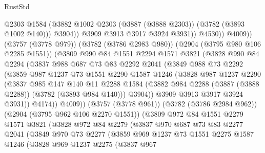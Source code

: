 \begin{lexlean}{RustStd}
\begin{coremodule}
                          @2303
                          @1584
                          (@3882 @1002 @2303 (@3887 (@3888 @2303)) (@3782 (@3893 @1002 @140)))
                          @3904))
                      @3909
                      @3913
                      @3917
                      @3924
                      @3931))
                  @4530))
              @4009))
          (@3757 (@3778 @979))
          (@3782 (@3786 @2983 @980))
          (@2904 (@3795 @980 @106 @2285 @1551))
          (@3809
            @990
            @84
            @1551
            @2294
            @1571
            @3821
            (@3828
              @990
              @84
              @2294
              (@3837
                @988
                @687
                @73
                @83
                @2292
                @2041
                (@3849
                  @988
                  @73
                  @2292
                  (@3859
                    @987
                    @1237
                    @73
                    @1551
                    @2290
                    @1587
                    @1246
                    (@3828
                      @987
                      @1237
                      @2290
                      (@3837
                        @985
                        @147
                        @140
                        @11
                        @2288
                        @1584
                        (@3882 @984 @2288 (@3887 (@3888 @2288)) (@3782 (@3893 @984 @140)))
                        @3904))
                    @3909
                    @3913
                    @3917
                    @3924
                    @3931))
                @4174))
            @4009))
        (@3757 (@3778 @961))
        (@3782 (@3786 @2984 @962))
        (@2904 (@3795 @962 @106 @2270 @1551))
        (@3809
          @972
          @84
          @1551
          @2279
          @1571
          @3821
          (@3828
            @972
            @84
            @2279
            (@3837
              @970
              @687
              @73
              @83
              @2277
              @2041
              (@3849
                @970
                @73
                @2277
                (@3859
                  @969
                  @1237
                  @73
                  @1551
                  @2275
                  @1587
                  @1246
                  (@3828
                    @969
                    @1237
                    @2275
                    (@3837
                      @967

\end{coremodule}
\end{lexlean}
